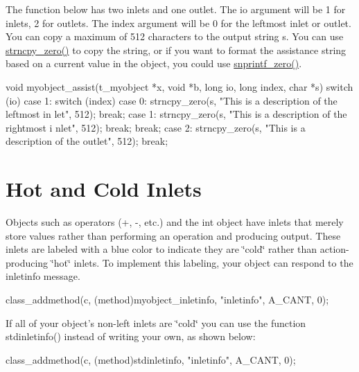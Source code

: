 The function below has two inlets and one outlet. The io argument will be 1 for inlets, 2 for outlets. The index argument will be 0 for the leftmost inlet or outlet. You can copy a maximum of 512 characters to the output string s. You can use \hyperlink{group__misc_ga0022303fac866c8f5757aa56b67ce29d}{strncpy\_\-zero()} to copy the string, or if you want to format the assistance string based on a current value in the object, you could use \hyperlink{group__misc_gab82e9c5bbc8b7fe70d16b1f6383f1cc4}{snprintf\_\-zero()}.


\begin{DoxyCode}
    void myobject_assist(t_myobject *x, void *b, long io, long index, char *s)
    {
        switch (io) {
            case 1: 
                switch (index) {
                    case 0:
                        strncpy_zero(s, "This is a description of the leftmost in
      let", 512);
                        break;
                    case 1: 
                        strncpy_zero(s, "This is a description of the rightmost i
      nlet", 512);
                        break;
                }
                break;
            case 2:
                strncpy_zero(s, "This is a description of the outlet", 512);
                break;
        }
    }
\end{DoxyCode}
\hypertarget{chapter_enhancements_chapter_enhancements_hotness}{}\section{Hot and Cold Inlets}\label{chapter_enhancements_chapter_enhancements_hotness}
Objects such as operators (+, -\/, etc.) and the int object have inlets that merely store values rather than performing an operation and producing output. These inlets are labeled with a blue color to indicate they are \char`\"{}cold\char`\"{} rather than action-\/producing \char`\"{}hot\char`\"{} inlets. To implement this labeling, your object can respond to the inletinfo message.


\begin{DoxyCode}
        class_addmethod(c, (method)myobject_inletinfo, "inletinfo", A_CANT, 0);
\end{DoxyCode}


If all of your object's non-\/left inlets are \char`\"{}cold\char`\"{} you can use the function stdinletinfo() instead of writing your own, as shown below: 
\begin{DoxyCode}
        class_addmethod(c, (method)stdinletinfo, "inletinfo", A_CANT, 0);
\end{DoxyCode}


